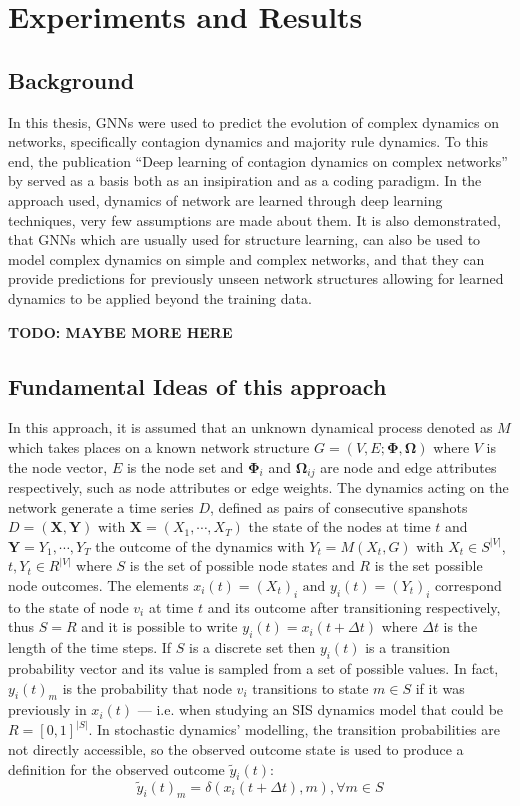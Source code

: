 \chapter{Experiments and Results} \label{experiments}

\section{Background}

In this thesis, GNNs were used to predict the evolution of
complex dynamics on networks, specifically contagion dynamics
and majority rule dynamics. To this end, the publication
``Deep learning of contagion dynamics on complex networks''
by \citet{murphy} served as a basis both as an insipiration
and as a coding paradigm. In the approach used, dynamics of network
are learned through deep learning techniques, very few assumptions
are made about them. It is also demonstrated, that GNNs which
are usually used for structure learning, can also be used to model
complex dynamics on simple and complex networks, and that they
can provide predictions for previously unseen network structures allowing
for learned dynamics to be applied beyond the training data. 

\textbf{TODO: MAYBE MORE HERE}

\section{Fundamental Ideas of this approach}

In this approach, it is assumed that an unknown dynamical process
denoted as $M$ which takes places on a known network structure
$G = (V, E; \bm{\Phi}, \bm{\Omega})$ where $V$ is the node vector,
$E$ is the node set and $\bm{\Phi}_i$ and $\bm{\Omega}_{ij}$ are node
and edge attributes respectively, such as node attributes or edge weights. 
The dynamics acting on the network generate a time series $D$, defined as
pairs of consecutive spanshots $D = (\bm{X}, \bm{Y})$ with
$\bm{X} = (X_1, \cdots, X_T)$ the state of the nodes at time $t$ and
$\bm{Y} = {Y_1, \cdots, Y_T}$ the outcome of the dynamics with
$Y_t = M(X_t, G)$ with $X_t \in S^{|V|}$, $t, Y_t \in R^{|V|}$ where
$S$ is the set of possible node states and $R$ is the set possible node
outcomes. The elements $x_i(t) = (X_t)_i \text{ and } y_i(t) = (Y_t)_i$
correspond to the state of node $v_i$ at time $t$ and its outcome after
transitioning respectively, thus $S=R$ and it is possible to write
$y_i(t) = x_i(t + \Delta t)$ where $\Delta t$ is the length of the
time steps. If $S$ is a discrete set then $y_i(t)$ is a transition
probability vector and its value is sampled from a set of possible
values. In fact, $y_i(t)_m$ is the probability that node $v_i$ transitions
to state $m \in S$ if it was previously in $x_i(t)$ --- i.e. when studying
an SIS dynamics model that could be $R = [0,1]^{|S|}$. In stochastic dynamics'
modelling, the transition probabilities are not directly accessible, so
the observed outcome state is used to produce a definition for the observed
outcome $\tilde{y}_i(t)$:
\begin{equation}
  \tilde{y}_i(t)_m = \delta (x_i(t+\Delta t), m), \forall m \in S
\end{equation}

